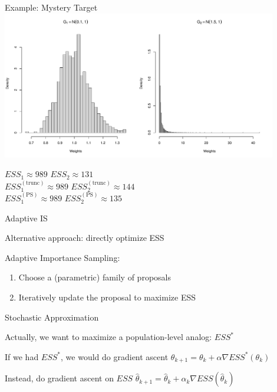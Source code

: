\documentclass[14pt]{beamer}
\begin{document}
\begin{frame}{Example: Mystery Target}
    \centering
    \includegraphics[height=0.5\textheight, width=0.9\textwidth, keepaspectratio]{Figures/Wt Hist - Pareto Smooth.pdf}\newline
    \begin{outline}
        $ESS_1 \approx 989$ \hspace{2.5cm} $ESS_2 \approx 131$\\
        $ESS_1^{(\mathrm{trunc})} \approx 989$ \hspace{2.5cm} $ESS_2^{(\mathrm{trunc})} \approx 144$\\
        $ESS_1^{(\mathrm{PS})} \approx 989$ \hspace{2.5cm} $ESS_2^{(\mathrm{PS})} \approx 135$
    \end{outline}
\end{frame}


\begin{frame}{Adaptive IS}
    \begin{outline}
        \1 Alternative approach: directly optimize ESS \newline

        \1 Adaptive Importance Sampling: 
            \2 \citep{Aky21} \newline
    \end{outline}

    \begin{enumerate}
        [default]
        \item Choose a (parametric) family of proposals
        \item Iteratively update the proposal to maximize ESS
    \end{enumerate}
\end{frame}

\begin{frame}{Stochastic Approximation}
    \begin{outline}
        \1 Actually, we want to maximize a population-level analog: $ESS^*$ \newline

        \1 If we had $ESS^*$, we would do gradient ascent
            \2 $\theta_{k+1} = \theta_k + \alpha \nabla ESS^*(\theta_k)$ \newline

        \1 Instead, do gradient ascent on $ESS$
            \2 $\hat{\theta}_{k+1} = \hat{\theta}_k + \alpha_k \nabla ESS(\hat{\theta}_k)$
    \end{outline}
\end{frame}
\end{document}
